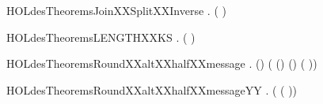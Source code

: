 \newcommand{\HOLdesTheoremsIPXXIIPXXInverse}{\UseVerbatim{HOLdesTheoremsIPXXIIPXXInverse}}
\begin{SaveVerbatim}{HOLdesTheoremsJoinXXSplitXXInverse}
\HOLTokenTurnstile{} \HOLSymConst{\HOLTokenForall{}}.  ( ) \HOLSymConst{=} 
\end{SaveVerbatim}
\newcommand{\HOLdesTheoremsJoinXXSplitXXInverse}{\UseVerbatim{HOLdesTheoremsJoinXXSplitXXInverse}}
\begin{SaveVerbatim}{HOLdesTheoremsLENGTHXXKS}
\HOLTokenTurnstile{} \HOLSymConst{\HOLTokenForall{}} .  (  ) \HOLSymConst{=} 
\end{SaveVerbatim}
\newcommand{\HOLdesTheoremsLENGTHXXKS}{\UseVerbatim{HOLdesTheoremsLENGTHXXKS}}
\begin{SaveVerbatim}{HOLdesTheoremsRoundXXaltXXhalfXXmessage}
\HOLTokenTurnstile{} \HOLSymConst{\HOLTokenForall{}}   .
        (\HOLSymConst{,}) \HOLSymConst{=}
     (  (\HOLSymConst{,})  \HOLSymConst{,}
        (\HOLSymConst{,})  ( ))
\end{SaveVerbatim}
\newcommand{\HOLdesTheoremsRoundXXaltXXhalfXXmessage}{\UseVerbatim{HOLdesTheoremsRoundXXaltXXhalfXXmessage}}
\begin{SaveVerbatim}{HOLdesTheoremsRoundXXaltXXhalfXXmessageYY}
\HOLTokenTurnstile{} \HOLSymConst{\HOLTokenForall{}}  .
         \HOLSymConst{=}
     (    \HOLSymConst{,}
          ( ))
\end{SaveVerbatim}
\newcommand{\HOLdesTheoremsRoundXXaltXXhalfXXmessageYY}{\UseVerbatim{HOLdesTheoremsRoundXXaltXXhalfXXmessageYY}}
